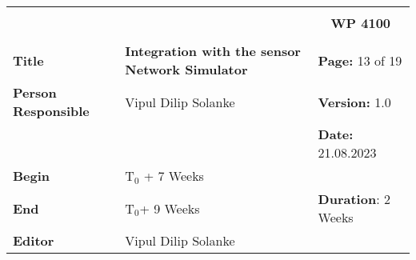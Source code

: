 \begin{table}[!h]
  \begin{center}
    \begin{tabular}{|p{35mm}||p{55mm}|p{50mm}||p{40mm}|}
      \hline
      \multicolumn{3}{|l||}{\textbf{}} & \multicolumn{1}{c|}{}                                                                                                                                                \\
      \multicolumn{3}{|l||}{\textbf{}} & \multicolumn{1}{c|}{\textbf{WP 4100}}                                                                                                                                \\
      \multicolumn{3}{|l||}{\textbf{}} & \multicolumn{1}{c|}{}                                                                                                                                                \\
      \hline\hline
      \textbf{Title}                   & \multicolumn{2}{p{7cm}||}{\textbf{Integration with the sensor Network Simulator}}
                                       & \textbf{Page:} 13 of 19                                                                                                                                             \\
      \hline
      \textbf{Person Responsible}        & \multicolumn{2}{l||}{Vipul Dilip Solanke}                                                                                                   & \textbf{Version:} 1.0   \\
      \hline
      \multicolumn{3}{|l||}{}          & \textbf{Date:} 21.08.2023                                                                                                                                          \\
      \hline\hline
      \textbf{Begin}                  & \multicolumn{2}{l||}{T$_0$ + 7 Weeks}                                                                                                                &                         \\
      \hline
      \textbf{End}                    & \multicolumn{2}{l||}{T$_0$+ 9 Weeks}                                                                                                        & \textbf{Duration}: 2 Weeks \\
      \hline\hline
      \textbf{Editor}              & \multicolumn{3}{l|}{Vipul Dilip Solanke}                                                                                                                              \\

\end{tabular}
\end{center}
\end{table}
